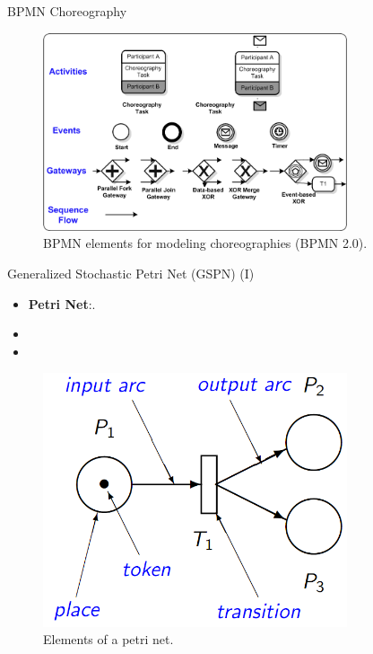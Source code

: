 \documentclass[xcolor=svgnames]{beamer}
\begin{document}
  \begin{frame}{BPMN Choreography}

    \begin{figure}[!h]
	      \centering
	      \includegraphics[width=0.8\textwidth]{BPMNBasicChoroegraphy.png}
	      \caption{BPMN elements for modeling choreographies (BPMN 2.0).}
      \end{figure}	
  \end{frame}

  \begin{frame}{ Generalized Stochastic Petri Net (GSPN) (I)}
    \begin{itemize}
	  \item \textbf{Petri Net}:.	
	  \item 
	  \item 
	\end{itemize}

    \begin{figure}[!h]
	      \centering
	      \includegraphics[width=0.8\textwidth]{petrinet.png}
	      \caption{Elements of a petri net.}
      \end{figure}	    
  \end{frame}
\end{document}
